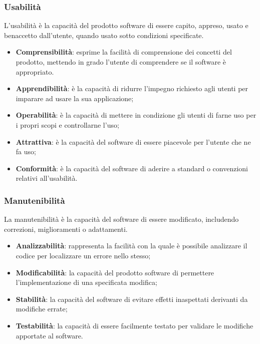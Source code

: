 \subsubsection{Usabilità}
L'usabilità è la capacità del prodotto software di essere capito, appreso, usato e benaccetto dall'utente, quando usato sotto condizioni specificate.

\begin{itemize}

    \item \textbf{Comprensibilità}: esprime la facilità di comprensione dei concetti del prodotto, mettendo in grado l'utente di comprendere se il software è appropriato.
    
    \item \textbf{Apprendibilità}: è la capacità di ridurre l'impegno richiesto agli utenti per imparare ad usare la sua applicazione;
    
    \item \textbf{Operabilità}: è la capacità di mettere in condizione gli utenti di farne uso per i propri scopi e controllarne l'uso;
    
    \item \textbf{Attrattiva}: è la capacità del software di essere piacevole per l'utente che ne fa uso;
    
    \item \textbf{Conformità}: è la capacità del software di aderire a standard o convenzioni relativi all'usabilità.
    
\end{itemize}

\subsubsection{Manutenibilità}
La manutenibilità è la capacità del software di essere modificato, includendo correzioni, miglioramenti o adattamenti.

\begin{itemize}

    \item \textbf{Analizzabilità}: rappresenta la facilità con la quale è possibile analizzare il codice per localizzare un errore nello stesso;
    
    \item \textbf{Modificabilità}: la capacità del prodotto software di permettere l'implementazione di una specificata modifica;
    
    \item \textbf{Stabilità}: la capacità del software di evitare effetti inaspettati derivanti da modifiche errate;
    
    \item \textbf{Testabilità}: la capacità di essere facilmente testato per validare le modifiche apportate al software.
    
\end{itemize}

